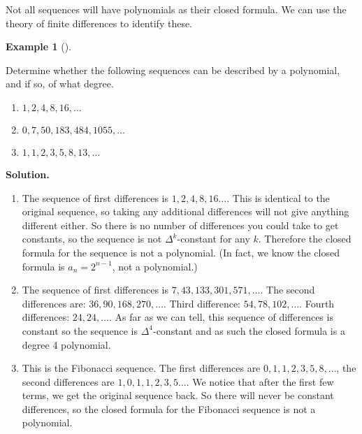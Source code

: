 \documentclass[10pt,]{book}
\theoremstyle{plain}
\theoremstyle{definition}
\newtheorem{example}[theorem]{Example}
\theoremstyle{definition}
\theoremstyle{definition}
\numberwithin{equation}{chapter}
\begin{document}
Not all sequences will have polynomials as their closed formula. We can use the theory of finite differences to identify these.
%
\begin{example}[]\label{example-71}

Determine whether the following sequences can be described by a polynomial, and if so, of what degree.
\leavevmode%
\begin{enumerate}
\item\hypertarget{li-923}{}\(1, 2, 4, 8, 16, \ldots\)%
\item\hypertarget{li-924}{}\(0, 7, 50, 183, 484, 1055, \ldots\)%
\item\hypertarget{li-925}{}\(1,1,2,3,5,8,13,\ldots\)%
\end{enumerate}

%
\par\medskip\noindent%
\textbf{Solution.}\quad
\leavevmode%
\begin{enumerate}
\item\hypertarget{li-926}{}
The sequence of first differences is \(1, 2, 4, 8, 16\ldots\).  This is identical to the original sequence, so taking any additional differences will not give anything different either.  So there is no number of differences you could take to get constants, so the sequence is not \(\Delta^k\)-constant for any \(k\).  Therefore the closed formula for the sequence is not a polynomial.  (In fact, we know the closed formula is \(a_n = 2^{n-1}\), not a polynomial.)
%
\item\hypertarget{li-927}{}
The sequence of first differences is \(7, 43, 133, 301, 571,\ldots\).  The second differences are: \(36, 90, 168, 270,\ldots\).  Third difference: \(54, 78, 102,\ldots\).  Fourth differences: \(24, 24, \ldots\).  As far as we can tell, this sequence of differences is constant so the sequence is \(\Delta^4\)-constant and as such the closed formula is a degree 4 polynomial.
%
\item\hypertarget{li-928}{}
This is the Fibonacci sequence.  The first differences are \(0, 1, 1, 2, 3, 5, 8, \ldots\), the second differences are \(1, 0, 1, 1, 2, 3,5\ldots\).  We notice that after the first few terms, we get the original sequence back.  So there will never be constant differences, so the closed formula for the Fibonacci sequence is not a polynomial.
%
\end{enumerate}

%
\end{example}
\typeout{************************************************}
\typeout{************************************************}
\end{document}
